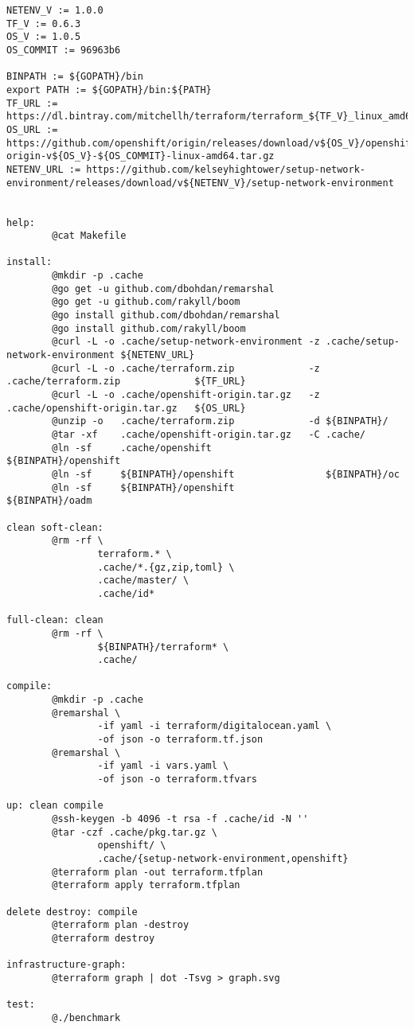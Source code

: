 \begin{verbatim}
NETENV_V := 1.0.0
TF_V := 0.6.3
OS_V := 1.0.5
OS_COMMIT := 96963b6

BINPATH := ${GOPATH}/bin
export PATH := ${GOPATH}/bin:${PATH}
TF_URL := https://dl.bintray.com/mitchellh/terraform/terraform_${TF_V}_linux_amd64.zip
OS_URL := https://github.com/openshift/origin/releases/download/v${OS_V}/openshift-origin-v${OS_V}-${OS_COMMIT}-linux-amd64.tar.gz
NETENV_URL := https://github.com/kelseyhightower/setup-network-environment/releases/download/v${NETENV_V}/setup-network-environment


help:
        @cat Makefile

install:
        @mkdir -p .cache
        @go get -u github.com/dbohdan/remarshal
        @go get -u github.com/rakyll/boom
        @go install github.com/dbohdan/remarshal
        @go install github.com/rakyll/boom
        @curl -L -o .cache/setup-network-environment -z .cache/setup-network-environment ${NETENV_URL}
        @curl -L -o .cache/terraform.zip             -z .cache/terraform.zip             ${TF_URL}
        @curl -L -o .cache/openshift-origin.tar.gz   -z .cache/openshift-origin.tar.gz   ${OS_URL}
        @unzip -o   .cache/terraform.zip             -d ${BINPATH}/
        @tar -xf    .cache/openshift-origin.tar.gz   -C .cache/
        @ln -sf     .cache/openshift                    ${BINPATH}/openshift
        @ln -sf     ${BINPATH}/openshift                ${BINPATH}/oc
        @ln -sf     ${BINPATH}/openshift                ${BINPATH}/oadm

clean soft-clean:
        @rm -rf \
                terraform.* \
                .cache/*.{gz,zip,toml} \
                .cache/master/ \
                .cache/id*

full-clean: clean
        @rm -rf \
                ${BINPATH}/terraform* \
                .cache/

compile:
        @mkdir -p .cache
        @remarshal \
                -if yaml -i terraform/digitalocean.yaml \
                -of json -o terraform.tf.json
        @remarshal \
                -if yaml -i vars.yaml \
                -of json -o terraform.tfvars

up: clean compile
        @ssh-keygen -b 4096 -t rsa -f .cache/id -N ''
        @tar -czf .cache/pkg.tar.gz \
                openshift/ \
                .cache/{setup-network-environment,openshift}
        @terraform plan -out terraform.tfplan
        @terraform apply terraform.tfplan

delete destroy: compile
        @terraform plan -destroy
        @terraform destroy

infrastructure-graph:
        @terraform graph | dot -Tsvg > graph.svg

test:
        @./benchmark
\end{verbatim}

